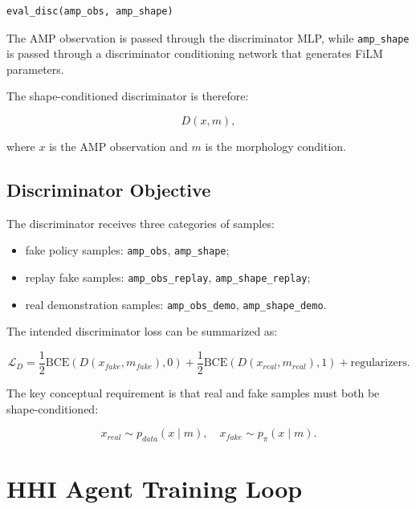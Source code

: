 \documentclass[11pt,a4paper]{article}
\begin{document}
\begin{lstlisting}
eval_disc(amp_obs, amp_shape)
\end{lstlisting}

The AMP observation is passed through the discriminator MLP, while \texttt{amp\_shape} is passed through a discriminator conditioning network that generates FiLM parameters.

The shape-conditioned discriminator is therefore:

\begin{equation}
    D(x,m),
\end{equation}

where $x$ is the AMP observation and $m$ is the morphology condition.

\subsection{Discriminator Objective}

The discriminator receives three categories of samples:

\begin{itemize}[leftmargin=2em]
    \item fake policy samples: \texttt{amp\_obs}, \texttt{amp\_shape};
    \item replay fake samples: \texttt{amp\_obs\_replay}, \texttt{amp\_shape\_replay};
    \item real demonstration samples: \texttt{amp\_obs\_demo}, \texttt{amp\_shape\_demo}.
\end{itemize}

The intended discriminator loss can be summarized as:

\begin{equation}
    \mathcal{L}_D =
    \frac{1}{2} \mathrm{BCE}(D(x_{fake},m_{fake}),0)
    + \frac{1}{2} \mathrm{BCE}(D(x_{real},m_{real}),1)
    + \text{regularizers}.
\end{equation}

The key conceptual requirement is that real and fake samples must both be shape-conditioned:

\begin{equation}
    x_{real} \sim p_{data}(x \mid m),
    \quad
    x_{fake} \sim p_\pi(x \mid m).
\end{equation}

\section{HHI Agent Training Loop}
\end{document}
